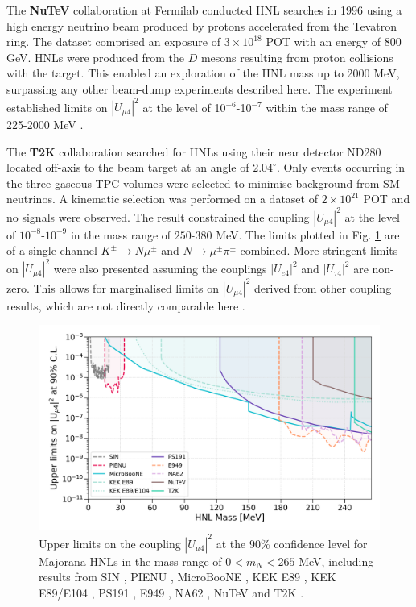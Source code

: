 \begin{coloritemize}
\item The \textbf{NuTeV} collaboration at Fermilab conducted HNL searches in 1996 using a high energy neutrino beam produced by protons accelerated from the Tevatron ring.
The dataset comprised an exposure of $3 \times 10^{18}$ POT with an energy of 800 GeV.
HNLs were produced from the $D$ mesons resulting from proton collisions with the target.
This enabled an exploration of the HNL mass up to 2000 MeV, surpassing any other beam-dump experiments described here.
The experiment established limits on $|U_{\mu4}|^{2}$ at the level of 10$^{-6}$-10$^{-7}$ within the mass range of 225-2000 MeV \cite{NuTeV}.

\item The \textbf{T2K} collaboration searched for HNLs using their near detector ND280 located off-axis to the beam target at an angle of $2.04^\circ$.
Only events occurring in the three gaseous TPC volumes were selected to minimise background from SM neutrinos.
A kinematic selection was performed on a dataset of $2\times10^{21}$ POT and no signals were observed.
The result constrained the coupling $|U_{\mu4}|^2$ at the level of $10^{-8}$-$10^{-9}$ in the mass range of $250$-$380$ MeV. 
The limits plotted in Fig. \ref{fig:sensitivity_theory} are of a single-channel $K^\pm \rightarrow N\mu^\pm$ and $N \rightarrow \mu^\pm\pi^\pm$ combined.
More stringent limits on $|U_{\mu4}|^2$ were also presented assuming the couplings $|U_{e4}|^2$ and $|U_{\tau4}|^2$ are non-zero.
This allows for marginalised limits on $|U_{\mu4}|^2$ derived from other coupling results, which are not directly comparable here \cite{t2k}.

\begin{figure}[t!] 
\centering    
\includegraphics[width=1.0\textwidth]{sensitivity}
\caption[Experimental Limits on the Coupling $|U_{\mu4}|^{2}$ of Heavy Neutral Leptons]{
Upper limits on the coupling $|U_{\mu4}|^{2}$ at the 90\% confidence level for Majorana HNLs in the mass range of $0 < m_{N} < 265$ MeV, 
including results from SIN \cite{SIN3}, PIENU \cite{PIENU}, MicroBooNE \cite{uboone1, uboone2, uboone3}, KEK E89 \cite{KEK2}, KEK E89/E104 \cite{KEK3}, PS191 \cite{PS191C}, E949 \cite{E949}, NA62 \cite{NA62B}, NuTeV \cite{NuTeV} and T2K \cite{t2k}.
}
\label{fig:sensitivity_theory}
\end{figure}


\end{coloritemize}
